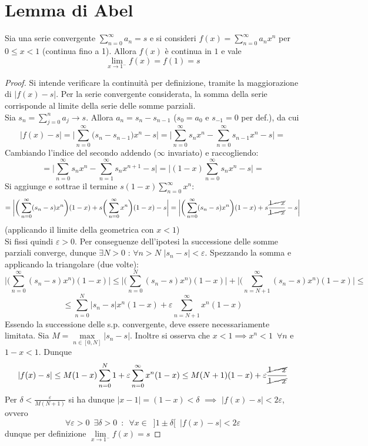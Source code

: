 \documentclass[10pt, oneside]{book}
\theoremstyle{plain}
\begin{document}
\section{Lemma di Abel}
\begin{lem}
Sia una serie convergente $\displaystyle \sum\limits_{n=0}^\infty a_n = s$ e si consideri $\displaystyle f(x) = \sum\limits_{n=0}^\infty a_n x^n$ per $0 \leq x < 1$ (continua fino a 1). Allora $f(x)$ è continua in $1$ e vale
\[\lim\limits_{x \rightarrow 1^-} f(x) = f(1) = s\]
\end{lem}
\begin{proof}
Si intende verificare la continuità per definizione, tramite la maggiorazione di $|f(x) - s|$. Per la serie convergente considerata, la somma della serie corrisponde al limite della serie delle somme parziali.
\\Sia $\displaystyle s_n = \sum\limits_{j=0}^n a_j \rightarrow s$. Allora $a_n = s_{n} - s_{n-1}$ ($s_0 = a_0$ e $s_{-1} = 0$ per def.), da cui
\[|f(x) - s| = \bigg|\sum\limits_{n=0}^\infty \big( s_{n} - s_{n-1}\big) x^n - s\bigg| = \bigg|\sum\limits_{n=0}^\infty s_n x^n - \sum\limits_{n=0}^\infty s_{n-1} x^n - s \bigg| =\]
Cambiando l'indice del secondo addendo ($\infty$ invariato) e raccogliendo:
\[= \bigg|\sum\limits_{n=0}^\infty s_n x^n - \sum\limits_{n=1}^\infty s_n x^{n+1} - s \bigg| = \bigg|(1-x) \sum\limits_{n=0}^\infty s_n x^n - s \bigg| = \]
Si aggiunge e sottrae il termine $\displaystyle s (1-x) \sum\limits_{n=0}^\infty x^n$:
\[= \bigg|\bigg(\sum\limits_{n=0}^\infty (s_n - s) x^n\bigg) (1-x) + s \bigg(\sum\limits_{n=0}^\infty x^n\bigg) (1-x) -s \bigg| = \bigg|\bigg(\sum\limits_{n=0}^\infty (s_n - s) x^n\bigg) (1-x) + s \frac{\cancel{1- x}}{\cancel{1 - x}} -s \bigg|\]
(applicando il limite della geometrica con $x < 1$)
\\Si fissi quindi $\varepsilon > 0$. Per conseguenze dell'ipotesi la successione delle somme parziali converge, dunque $\exists N > 0$ : $\forall n > N$ $|s_n - s| < \varepsilon$. Spezzando la somma e applicando la triangolare (due volte):
\[\bigg|\bigg(\sum\limits_{n=0}^\infty (s_n - s) x^n\bigg) (1-x)\bigg| \leq \bigg|\bigg(\sum\limits_{n=0}^N (s_n - s) x^n\bigg) (1-x)\bigg| + \bigg|\bigg(\sum\limits_{n=N+1}^\infty (s_n - s) x^n\bigg) (1-x)\bigg| \leq\]
\[ \leq \sum\limits_{n=0}^N |s_n - s| x^n (1-x) + \varepsilon \sum\limits_{n=N+1}^\infty x^n (1-x)\]
Essendo la successione delle s.p. convergente, deve essere necessariamente limitata. Sia $\displaystyle M = \max\limits_{n \in [0,N]} |s_n - s|$. Inoltre si osserva che $x < 1 \implies x^n < 1 \enspace \forall n$ e $1-x < 1$. Dunque
\[|f(x) - s| \leq M (1-x) \sum\limits_{n=0}^N 1 + \varepsilon \sum\limits_{n=0}^\infty x^n (1-x) \leq M (N+1) (1-x) + \varepsilon \frac{\cancel{1-x}}{\cancel{1-x}}\]
Per $\displaystyle \delta < \frac{\varepsilon}{M (N+1)}$ si ha dunque $|x - 1| = (1-x) < \delta$ $\implies$ $|f(x) - s| < 2 \varepsilon$, ovvero
\[\forall \varepsilon > 0 \enspace \exists \delta > 0 \enspace : \enspace \forall x \in \enspace ]1 \pm \delta[ \enspace |f(x) - s| < 2\varepsilon\]
dunque per definizione $\displaystyle \lim\limits_{x \rightarrow 1^-} f(x) = s$
\end{proof}
\end{document}
